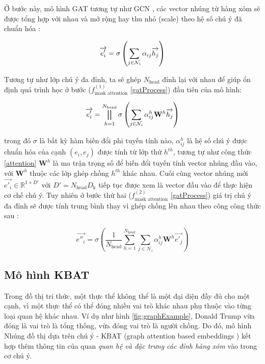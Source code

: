 Ở bước này, mô hình GAT tương tự như GCN \cite{kipf2016semi}, các vector nhúng từ hàng xóm sẽ được tổng hợp với nhau và mở rộng hay thu nhỏ (scale) theo hệ số chú ý đã chuẩn hóa :

\begin{equation}
\label{scaleAttentionCoef}
\centering
{\overrightarrow{e'_i}}={\sigma\left(\sum_{j\in \mathcal{N}_i} {\alpha_{ij} \overrightarrow{h_j} }\right)}
\end{equation}

Tương tự như lớp chú ý đa đỉnh, ta sẽ ghép $N_{\text{head}}$ đỉnh lại với nhau để giúp ổn định quá trình học ở bước ($f_{\text{mask attention}}^{(1)}$ \ref{gatProcess}) đầu tiên của mô hình:

\begin{equation}
\label{multiHeadAttention}
{\overrightarrow{e'_i}}={\bigparallel_{h=1}^{N_{\text{head}}}\sigma\left(\sum_{j\in \mathcal{N}_i}\alpha_{ij}^{h} \mathbf{W}^{h} \overrightarrow{h_{j}} \right)}
\end{equation}

trong đó $\sigma$ là bất kỳ hàm biến đổi phi tuyến tính nào, $\alpha_{ij}^h$ là hệ số chú ý được chuẩn hóa của cạnh $(e_i, e_j)$ được tính từ lớp thứ $h^{th}$, tương tự như công thức \ref{attention} $\mathbf{W}^h$ là ma trận trọng số để biến đổi tuyến tính vector nhúng đầu vào, với $\mathbf{W}^h$ thuộc các lớp ghép chồng $h^{th}$ khác nhau. Cuối cùng vector nhúng mới $\overrightarrow{e'_i} \in \mathbb{R}^{1 \times D'}$ với $D' = N_{\text{head}} D_{\text{k}}$ tiếp tục được xem là vector đầu vào để thực hiện cơ chế chú ý. Tuy nhiên ở bước thứ hai ($f_{\text{mask attention}}^{(2)}$ \ref{gatProcess}) giá trị chú ý đa đỉnh sẽ được tính trung bình thay vì ghép chồng lên nhau theo công công thức sau :

\begin{equation}
\label{multiHeadConcat}
{\overrightarrow{e''_i}}={\sigma\left(\frac{1}{N_{\text{head}}} \sum_{h=1}^{N_{\text{head}}}\sum_{j\in \mathcal{N}_i}\alpha_{ij}^{h} \mathbf{W}^{h} \overrightarrow{e'_{j}} \right)}
\end{equation}

\subsection{Mô hình KBAT}

Trong đồ thị tri thức, một thực thể không thể là một đại diện đầy đủ cho một cạnh, vì một thực thể có thể đóng nhiều vai trò khác nhau phụ thuộc vào từng loại quan hệ khác nhau. Ví dụ như hình \ref{fig:graphExample}, Donald Trump vừa đóng là vai trò là tổng thống, vừa đóng vai trò là người chồng. Do đó, mô hình Nhúng đồ thị dựa trên chú ý - KBAT (graph attention based embeddings \cite{nathani2019learning}) kết hợp thêm thông tin của quan \textit{quan hệ và đặc trưng các đỉnh hàng xóm} vào trong cơ chú ý.


